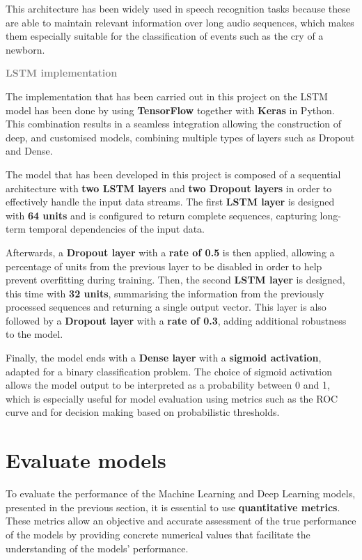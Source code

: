 \begin{tcolorbox}
This architecture has been widely used in speech recognition tasks because these are able to maintain relevant information over long audio sequences, which makes them especially suitable for the classification of events such as the cry of a newborn. 
\end{tcolorbox}


{\fontsize{16pt}{16pt}\textcolor{gray}{\textbf{LSTM implementation}}}

The implementation that has been carried out in this project on the LSTM model has been done by using \textbf{TensorFlow} together with \textbf{Keras} in Python. This combination results in a seamless integration allowing the construction of deep, and customised models, combining multiple types of layers such as Dropout and Dense.

The model that has been developed in this project is composed of a sequential architecture with \textbf{two LSTM layers} and \textbf{two Dropout layers} in order to effectively handle the input data streams. The first \textbf{LSTM layer} is designed with \textbf{64 units} and is configured to return complete sequences, capturing long-term temporal dependencies of the input data. 

Afterwards, a \textbf{Dropout layer} with a \textbf{rate of 0.5} is then applied, allowing a percentage of units from the previous layer to be disabled in order to help prevent overfitting during training. Then, the second \textbf{LSTM layer} is designed, this time with \textbf{32 units}, summarising the information from the previously processed sequences and returning a single output vector. This layer is also followed by a \textbf{Dropout layer} with a \textbf{rate of 0.3}, adding additional robustness to the model.

Finally, the model ends with a \textbf{Dense layer} with a \textbf{sigmoid activation}, adapted for a binary classification problem. The choice of sigmoid activation allows the model output to be interpreted as a probability between 0 and 1, which is especially useful for model evaluation using metrics such as the ROC curve and for decision making based on probabilistic thresholds. 


\section{Evaluate models}

To evaluate the performance of the Machine Learning and Deep Learning models, presented in the previous section, it is essential to use \textbf{quantitative metrics}. These metrics allow an objective and accurate assessment of the true performance of the models by providing concrete numerical values that facilitate the understanding of the models' performance. 

